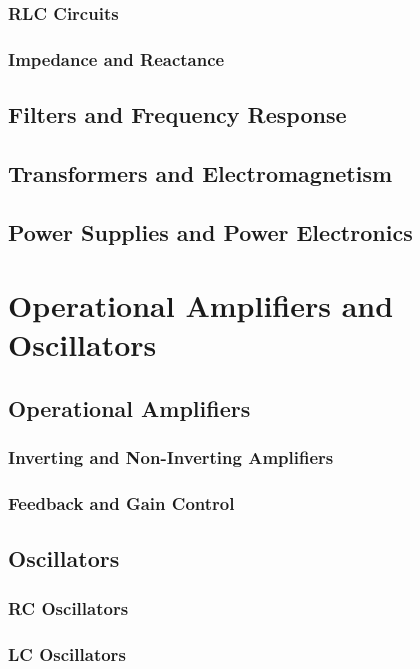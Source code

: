 \documentclass[11pt]{article}
\begin{document}
\subsubsection{RLC Circuits}
\subsubsection{Impedance and Reactance}
\subsection{Filters and Frequency Response} \label{subsec:filters}
\subsection{Transformers and Electromagnetism} \label{subsec:transformers}
\subsection{Power Supplies and Power Electronics}
\label{subsec:power_electronics}

\section{Operational Amplifiers and Oscillators} \label{sec:opamps_oscillators}
\subsection{Operational Amplifiers} \label{subsec:opamps}
\subsubsection{Inverting and Non-Inverting Amplifiers}
\subsubsection{Feedback and Gain Control}
\subsection{Oscillators} \label{subsec:oscillators}
\subsubsection{RC Oscillators}
\subsubsection{LC Oscillators}
\end{document}

